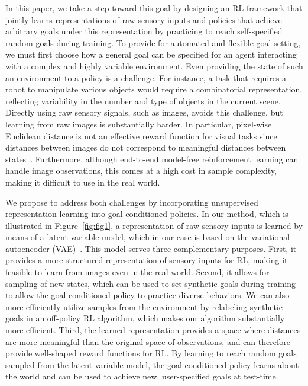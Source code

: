 \documentclass{article}
\begin{document}
In this paper, we take a step toward this goal by designing an RL framework that jointly learns representations of raw sensory inputs and policies that achieve arbitrary goals under this representation by practicing to reach self-specified random goals during training.
To provide for automated and flexible goal-setting, we must first choose how a general goal can be specified for an agent interacting with a complex and highly variable environment.
Even providing the state of such an environment to a policy is a challenge. For instance, a task that requires a robot to manipulate various objects would require a combinatorial representation, reflecting variability in the number and type of objects in the current scene.
Directly using raw sensory signals, such as images, avoids this challenge, but learning from raw images is substantially harder.
In particular, pixel-wise Euclidean distance is not an effective reward function for visual tasks since distances between images do not correspond to meaningful distances between states~\citep{ponomarenko2015image,zhang2018unreasonable}.
Furthermore, although end-to-end model-free reinforcement learning can handle image observations, this comes at a high cost in sample complexity, making it difficult to use in the real world.

We propose to address both challenges by incorporating unsupervised representation learning into goal-conditioned policies.
In our method, which is illustrated in Figure~\ref{fig:fig1}, a representation of raw sensory inputs is learned by means of a latent variable model, which in our case is based on the variational autoencoder (VAE)~\cite{kingma2014vae}.
This model serves three complementary purposes.
First, it provides a more structured representation of sensory inputs for RL, making it feasible to learn from images even in the real world.
Second, it allows for sampling of new states, which can be used to set synthetic goals during training to allow the goal-conditioned policy to practice diverse behaviors.
We can also more efficiently utilize samples from the environment by relabeling synthetic goals in an off-policy RL algorithm, which makes our algorithm substantially more efficient.
Third, the learned representation provides a space where distances are more meaningful than the original space of observations, and can therefore provide well-shaped reward functions for RL.
By learning to reach random goals sampled from the latent variable model, the goal-conditioned policy learns about the world and can be used to achieve new, user-specified goals at test-time.
\end{document}
